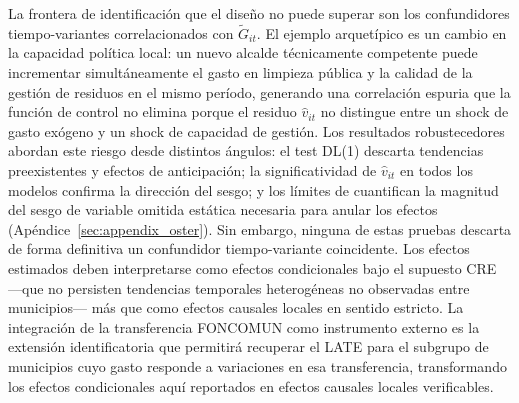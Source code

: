La frontera de identificación que el diseño no puede superar son los confundidores tiempo-variantes correlacionados con $\tilde{G}_{it}$.
El ejemplo arquetípico es un cambio en la capacidad política local: un nuevo alcalde técnicamente competente puede incrementar simultáneamente el gasto en limpieza pública y la calidad de la gestión de residuos en el mismo período, generando una correlación espuria que la función de control no elimina porque el residuo $\hat{v}_{it}$ no distingue entre un shock de gasto exógeno y un shock de capacidad de gestión.
Los resultados robustecedores abordan este riesgo desde distintos ángulos: el test DL(1) descarta tendencias preexistentes y efectos de anticipación; la significatividad de $\hat{v}_{it}$ en todos los modelos confirma la dirección del sesgo; y los límites de \citet{Oster2019} cuantifican la magnitud del sesgo de variable omitida estática necesaria para anular los efectos (Apéndice~\ref{sec:appendix_oster}).
Sin embargo, ninguna de estas pruebas descarta de forma definitiva un confundidor tiempo-variante coincidente.
Los efectos estimados deben interpretarse como efectos condicionales bajo el supuesto CRE ---que no persisten tendencias temporales heterogéneas no observadas entre municipios--- más que como efectos causales locales en sentido estricto.
La integración de la transferencia FONCOMUN como instrumento externo es la extensión identificatoria que permitirá recuperar el LATE para el subgrupo de municipios cuyo gasto responde a variaciones en esa transferencia, transformando los efectos condicionales aquí reportados en efectos causales locales verificables.
